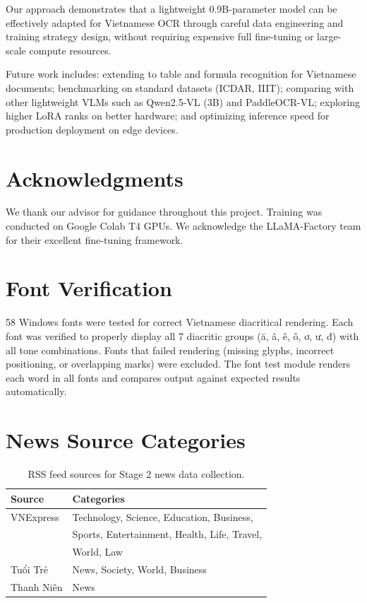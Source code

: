 \documentclass[11pt]{article}
\begin{document}
Our approach demonstrates that a lightweight 0.9B-parameter model can be effectively adapted for Vietnamese OCR through careful data engineering and training strategy design, without requiring expensive full fine-tuning or large-scale compute resources.

Future work includes: extending to table and formula recognition for Vietnamese documents; benchmarking on standard datasets (ICDAR, IIIT); comparing with other lightweight VLMs such as Qwen2.5-VL (3B) and PaddleOCR-VL; exploring higher LoRA ranks on better hardware; and optimizing inference speed for production deployment on edge devices.

\section*{Acknowledgments}

We thank our advisor for guidance throughout this project. 
Training was conducted on Google Colab T4 GPUs. 
We acknowledge the LLaMA-Factory \cite{llamafactory2024} team for their excellent fine-tuning framework.



\appendix

\section{Font Verification}

58 Windows fonts were tested for correct Vietnamese diacritical rendering. 
Each font was verified to properly display all 7 diacritic groups (ă, â, ê, ô, ơ, ư, đ) with all tone combinations. 
Fonts that failed rendering (missing glyphs, incorrect positioning, or overlapping marks) were excluded. 
The font test module renders each word in all fonts and compares output against expected results automatically.

\section{News Source Categories}

\begin{table}[h]
\centering
\small
\begin{tabular}{@{}ll@{}}
\toprule
\textbf{Source} & \textbf{Categories} \\
\midrule
VNExpress & Technology, Science, Education, Business, \\
 & Sports, Entertainment, Health, Life, Travel, \\
 & World, Law \\
Tuổi Trẻ & News, Society, World, Business \\
Thanh Niên & News \\
\bottomrule
\end{tabular}
\caption{RSS feed sources for Stage 2 news data collection.}
\end{table}
\end{document}
